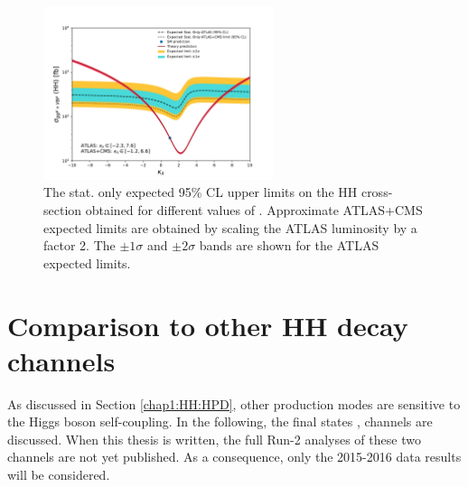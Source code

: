 \begin{figure}[htbp]
    \centering
    \includegraphics[width=0.6\textwidth]{Ch5/Img/kappa_lambda_ATLAS_CMS_stat.pdf}
    \begin{tcolorbox}[colback=black!5!white, colframe=white!75!black]
    \caption{The stat. only expected 95\% CL upper limits on the HH cross-section obtained for different values of \kl. Approximate ATLAS+CMS expected limits are obtained by scaling the ATLAS luminosity by a factor 2. The $\pm1\sigma$ and $\pm2\sigma$ bands are shown for the ATLAS expected limits.}
    \label{fig:HHyybb:CMS+ATLAS}
    \end{tcolorbox}
\end{figure}


\section{Comparison to other HH decay channels}
\label{HHyybb:HH}
As discussed in Section \ref{chap1:HH:HPD}, other production modes are sensitive to the Higgs boson self-coupling. In the following, the final states \bbbb, \bbtt channels are discussed. When this thesis is written, the full Run-2 analyses of these two channels are not yet published. As a consequence, only the 2015-2016 data results will be considered.

